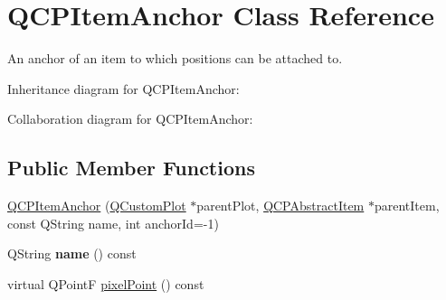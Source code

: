 \hypertarget{class_q_c_p_item_anchor}{}\section{Q\+C\+P\+Item\+Anchor Class Reference}
\label{class_q_c_p_item_anchor}


An anchor of an item to which positions can be attached to.  




Inheritance diagram for Q\+C\+P\+Item\+Anchor\+:


Collaboration diagram for Q\+C\+P\+Item\+Anchor\+:
\subsection*{Public Member Functions}
\begin{DoxyCompactItemize}
\item 
\hyperlink{class_q_c_p_item_anchor_aeb6b681d2bf324db40a915d32ec5624f}{Q\+C\+P\+Item\+Anchor} (\hyperlink{class_q_custom_plot}{Q\+Custom\+Plot} $\ast$parent\+Plot, \hyperlink{class_q_c_p_abstract_item}{Q\+C\+P\+Abstract\+Item} $\ast$parent\+Item, const Q\+String name, int anchor\+Id=-\/1)
\item 
Q\+String {\bfseries name} () const \hypertarget{class_q_c_p_item_anchor_ac93984042a58c875e76847dc3e5f75fe}{}\label{class_q_c_p_item_anchor_ac93984042a58c875e76847dc3e5f75fe}

\item 
virtual Q\+PointF \hyperlink{class_q_c_p_item_anchor_ae92def8f9297c5d73f5806c586517bb3}{pixel\+Point} () const 
\end{DoxyCompactItemize}
